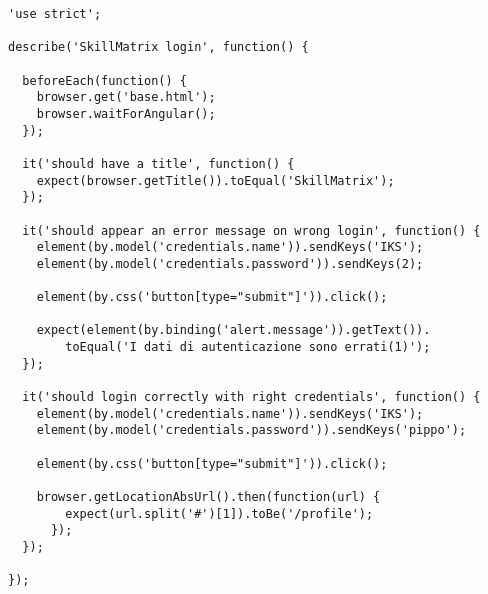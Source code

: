 \begin{verbatim}
'use strict';

describe('SkillMatrix login', function() {

  beforeEach(function() {
    browser.get('base.html');
    browser.waitForAngular();
  });

  it('should have a title', function() {
    expect(browser.getTitle()).toEqual('SkillMatrix');
  });

  it('should appear an error message on wrong login', function() {
    element(by.model('credentials.name')).sendKeys('IKS');
    element(by.model('credentials.password')).sendKeys(2);

    element(by.css('button[type="submit"]')).click();

    expect(element(by.binding('alert.message')).getText()).
        toEqual('I dati di autenticazione sono errati(1)');
  });

  it('should login correctly with right credentials', function() {
    element(by.model('credentials.name')).sendKeys('IKS');
    element(by.model('credentials.password')).sendKeys('pippo');

    element(by.css('button[type="submit"]')).click();

    browser.getLocationAbsUrl().then(function(url) {
        expect(url.split('#')[1]).toBe('/profile');
      });
  });
  
});
\end{verbatim}